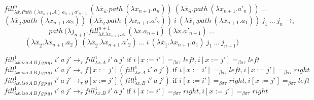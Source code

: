 \documentclass{amsart}
\theoremstyle{definition}
\theoremstyle{remark}
\newcommand{\bs}{\beta\sigma}
\newcommand{\bst}{\bs\tau}
\newcommand{\ebst}{=_{\bst}}
\numberwithin{figure}{section}
\begin{document}
\[ fill^n_{\lambda \overline{x}. Path\ (\lambda x_{n+1}. A)\ a_{n+1}\ a'_{n+1}}\ (\lambda \overline{x}_{\hat{n}}. path\ (\lambda x_{n+1}. a_n))\ (\lambda \overline{x}_{\hat{n}}. path\ (\lambda x_{n+1}. a'_n))\ \ldots \]
\[ (\lambda \overline{x}_{\hat{2}}. path\ (\lambda x_{n+1}. a_2))\ (\lambda \overline{x}_{\hat{2}}. path\ (\lambda x_{n+1}. a'_2))\ i\ (\lambda \overline{x}_{\hat{1}}. path\ (\lambda x_{n+1}. a_1))\ j_1\ \ldots\ j_n \to_\tau \]
\[ path\ (\lambda j_{n+1}. fill^{n+1}_{\lambda \overline{x}. \lambda x_{n+1}. A}\ (\lambda \overline{x}. a_{n+1})\ (\lambda \overline{x}. a'_{n+1})\ \ldots \]
\[ (\lambda \overline{x}_{\hat{2}}. \lambda x_{n+1}. a_2)\ (\lambda \overline{x}_{\hat{2}}. \lambda x_{n+1}. a'_2)\ \ldots\ i\ (\lambda \overline{x}_{\hat{1}}. \lambda x_{n+1}. a_1)\ j_1\ \ldots\ j_{n+1}) \]

\[ fill^1_{\lambda x. iso\,A\,B\,f\,g\,p\,q\,i}\ i'\ a\ j' \to_\tau fill^1_{\lambda x. A}\ i'\ a\ j' \text{ if } i[x := i'] \ebst left, i[x := j'] \ebst left \]
\[ fill^1_{\lambda x. iso\,A\,B\,f\,g\,p\,q\,i}\ i'\ a\ j' \to_\tau f[x := j'] (fill^1_{\lambda x. A}\ i'\ a\ j') \text{ if } i[x := i'] \ebst left, i[x := j'] \ebst right \]
\[ fill^1_{\lambda x. iso\,A\,B\,f\,g\,p\,q\,i}\ i'\ a\ j' \to_\tau g[x := j'] (fill^1_{\lambda x. B}\ i'\ a\ j') \text{ if } i[x := i'] \ebst right, i[x := j'] \ebst left \]
\[ fill^1_{\lambda x. iso\,A\,B\,f\,g\,p\,q\,i}\ i'\ a\ j' \to_\tau fill^1_{\lambda x. B}\ i'\ a\ j' \text{ if } i[x := i'] \ebst right, i[x := j'] \ebst right \]

\centerAlignProof
\end{document}
